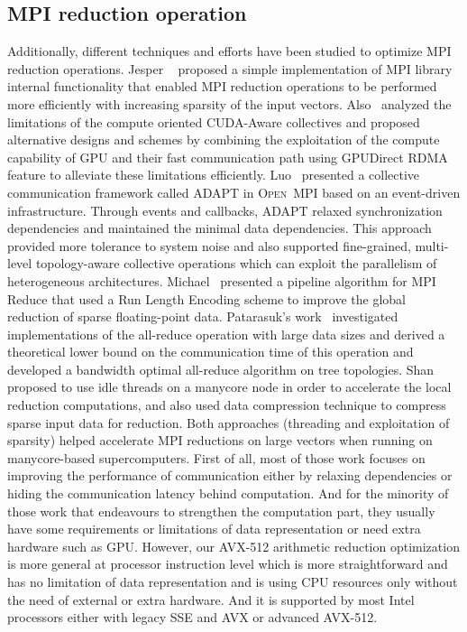 \documentclass[sigconf]{acmart}
\newcommand{\ompi}[0]{\textsc{Open~MPI}\xspace}
\newcommand{\mpi}[0]{\textsc{MPI}\xspace}
\begin{document}
\subsection{\mpi reduction operation}
Additionally, different techniques and
efforts have been studied to optimize \mpi reduction operations. Jesper
~\cite{Neutral_MPI_Reduction} proposed a simple implementation of MPI library
internal functionality that enabled MPI reduction operations to be performed
more efficiently with increasing sparsity of the input vectors.
%
Also~\cite{gpu-reduce} analyzed the limitations of the compute oriented CUDA-Aware
collectives and proposed alternative designs and schemes by combining the exploitation of the
compute capability of GPU and their fast communication
path using GPUDirect RDMA feature to alleviate these limitations efficiently.
%
Luo~\cite{Luo-adapt} presented a collective communication framework called ADAPT
in \ompi based on an event-driven infrastructure. Through events and callbacks,
ADAPT relaxed synchronization dependencies and maintained the minimal data dependencies.
This approach provided more tolerance to system noise and also supported fine-grained,
multi-level topology-aware collective operations which can exploit the
parallelism of heterogeneous architectures.
%
Michael~\cite{sparse-reduction} presented a pipeline algorithm for MPI Reduce
that used a Run Length Encoding scheme to improve the global reduction of sparse
floating-point data.
Patarasuk's work~\cite{all-reduce09} investigated implementations of the all-reduce operation
with large data sizes and derived a theoretical lower bound on the communication time of this operation and developed
a bandwidth optimal all-reduce algorithm on tree topologies.
%
Shan~\cite{shan-reduce} proposed to use idle threads on a manycore node in order to accelerate
the local reduction computations, and also used data compression technique to compress sparse input data for reduction.
Both approaches (threading and exploitation
of sparsity) helped accelerate MPI reductions on large vectors when
running on manycore-based supercomputers.
%
First of all, most of those work  focuses on improving the performance of
communication either by relaxing dependencies or hiding the communication latency behind computation.
And for the minority of those work that endeavours to strengthen the computation part,
they usually have some requirements or limitations of data
representation or need extra hardware such as GPU.
However, our AVX-512 arithmetic reduction
optimization is more general at processor instruction level which is more
straightforward and has no limitation of data representation and is using CPU resources only
without the need of external or extra hardware.
And it is supported by most Intel processors either with legacy SSE and AVX or advanced AVX-512.
\end{document}
